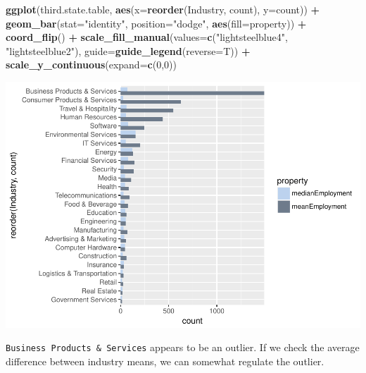 \documentclass[]{article}
\newenvironment{Shaded}{\begin{snugshade}}{\end{snugshade}}
\newcommand{\KeywordTok}[1]{\textcolor[rgb]{0.13,0.29,0.53}{\textbf{#1}}}
\newcommand{\DataTypeTok}[1]{\textcolor[rgb]{0.13,0.29,0.53}{#1}}
\newcommand{\DecValTok}[1]{\textcolor[rgb]{0.00,0.00,0.81}{#1}}
\newcommand{\StringTok}[1]{\textcolor[rgb]{0.31,0.60,0.02}{#1}}
\newcommand{\CommentTok}[1]{\textcolor[rgb]{0.56,0.35,0.01}{\textit{#1}}}
\newcommand{\OperatorTok}[1]{\textcolor[rgb]{0.81,0.36,0.00}{\textbf{#1}}}
\newcommand{\NormalTok}[1]{#1}
\begin{document}
\begin{Shaded}
\begin{Highlighting}[]
\KeywordTok{ggplot}\NormalTok{(third.state.table, }\KeywordTok{aes}\NormalTok{(}\DataTypeTok{x=}\KeywordTok{reorder}\NormalTok{(Industry, count), }\DataTypeTok{y=}\NormalTok{count)) }\OperatorTok{+}
\StringTok{  }\KeywordTok{geom_bar}\NormalTok{(}\DataTypeTok{stat=}\StringTok{"identity"}\NormalTok{, }\DataTypeTok{position=}\StringTok{"dodge"}\NormalTok{, }\KeywordTok{aes}\NormalTok{(}\DataTypeTok{fill=}\NormalTok{property)) }\OperatorTok{+}
\StringTok{  }\KeywordTok{coord_flip}\NormalTok{() }\OperatorTok{+}
\StringTok{  }\KeywordTok{scale_fill_manual}\NormalTok{(}\DataTypeTok{values=}\KeywordTok{c}\NormalTok{(}\StringTok{"lightsteelblue4"}\NormalTok{, }\StringTok{"lightsteelblue2"}\NormalTok{), }\DataTypeTok{guide=}\KeywordTok{guide_legend}\NormalTok{(}\DataTypeTok{reverse=}\NormalTok{T)) }\OperatorTok{+}
\StringTok{  }\KeywordTok{scale_y_continuous}\NormalTok{(}\DataTypeTok{expand=}\KeywordTok{c}\NormalTok{(}\DecValTok{0}\NormalTok{,}\DecValTok{0}\NormalTok{))}
\end{Highlighting}
\end{Shaded}

\includegraphics{DATA_608_Project_1_files/figure-latex/unnamed-chunk-7-1.pdf}

\texttt{Business\ Products\ \&\ Services} appears to be an outlier. If
we check the average difference between industry means, we can somewhat
regulate the outlier.

\begin{Shaded}
\end{Shaded}
\end{document}
